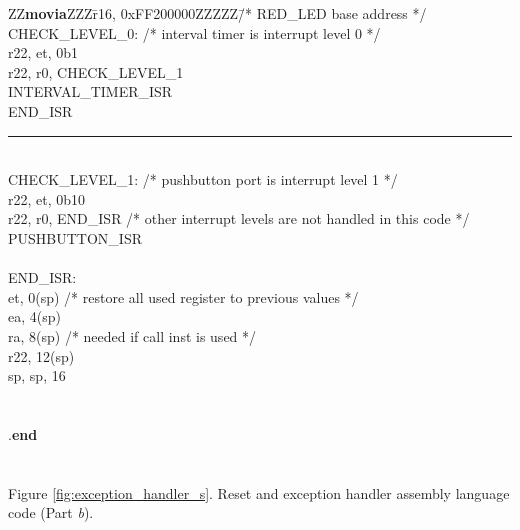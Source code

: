 \begin{center}
\begin{minipage}[t]{12.5 cm}
\begin{tabbing}
ZZ\={\bf movia}ZZZ\=r16, 0xFF200000ZZZZZ\=/* RED\_LED base address */\kill
CHECK\_LEVEL\_0: \>\>\>/* interval timer is interrupt level 0 */\\
 \>r22, et, 0b1\\
 \>r22, r0, CHECK\_LEVEL\_1\\
 \>INTERVAL\_TIMER\_ISR				\\
 \>END\_ISR\\
\rule{6.0in}{0in}~\\
CHECK\_LEVEL\_1: \>\>\>/* pushbutton port is interrupt level 1 */\\
 \>r22, et, 0b10\\
 \>r22, r0, END\_ISR \>/* other interrupt levels are not handled in this code */\\
 \>PUSHBUTTON\_ISR				\\
~\\
END\_ISR:\\
 \>et, 0(sp) \>/* restore all used register to previous values */\\
 \>ea, 4(sp) \\
 \>ra, 8(sp) \>/* needed if call inst is used */\\
 \>r22, 12(sp)\\
 \>sp, sp, 16\\
~\\
\\
\>.{\bf end}\\
~\\
~\\
Figure \ref{fig:exception_handler_s}. Reset and exception handler assembly language code (Part {\it b}).
\end{tabbing}
\end{minipage}
\end{center}
